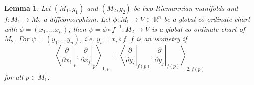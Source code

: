 \documentclass[letter-paper]{tufte-book}
\newtheorem{lemma}[theorem]{\color{pastel-blue}Lemma}
\begin{document}
\begin{lemma}
  Let $(M_1, g_1)$ and $(M_2, g_2)$ be two Riemannian manifolds and $f: M_1 \to M_2$ a diffeomorphism. Let $\phi: M_1 \to V \subset \mathbb{R}^n$ be a global co-ordinate chart with $\phi = (x_1, \ldots x_n)$, then $\psi = \phi \circ f^{-1} : M_2 \to V$ is a global co-ordinate chart of $M_2$. For $\psi = (y_1, \ldots y_n)$, i.e. $y_i = x_i \circ f$, $f$ is an isometry if
  \begin{equation*}
    \left\langle \left.\frac{\partial}{\partial x_i}\right|_p, \left.\frac{\partial}{\partial x_j}\right|_p \right\rangle_{1,p} = \left\langle \left.\frac{\partial}{\partial y_i}\right|_{f(p)}, \left.\frac{\partial}{\partial y_j}\right|_{f(p)} \right\rangle_{2, f(p)}
  \end{equation*}
  for all $p \in M_1$.
\end{lemma}
\end{document}

